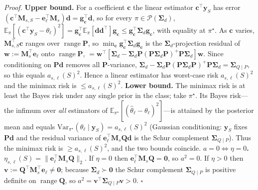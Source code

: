 \noindent\emph{Proof.}
\textbf{Upper bound.} For a coefficient $\bm c$ the linear estimator $\bm c^\top\bm y_S$ has error
$(\bm c^\top\bm M_{s,S}-\bm e_\ell^\top\bm M_s)\bm d=\bm g_{\bm c}^\top\bm d$, so for every
$\pi\in\mathcal P(\bm\Sigma_d)$, $\mathbb E_\pi[(\bm c^\top\bm y_S-\theta_\ell)^2]=
\bm g_{\bm c}^\top\mathbb E_\pi[\bm d\bm d^\top]\bm g_{\bm c}\le\bm g_{\bm c}^\top\bm\Sigma_d
\bm g_{\bm c}$, with equality at $\pi^\star$. As $\bm c$ varies, $\bm M_{s,S}^\top\bm c$ ranges over
$\operatorname{range}\bm P$, so $\min_{\bm c}\bm g_{\bm c}^\top\bm\Sigma_d\bm g_{\bm c}$ is the
$\bm\Sigma_d$-projection residual of $\bm w:=\bm M_s^\top\bm e_\ell$ onto $\operatorname{range}\bm P$,
$=\bm w^\top[\bm\Sigma_d-\bm\Sigma_d\bm P(\bm P\bm\Sigma_d\bm P)^{+}\bm P\bm\Sigma_d]\bm w$. Since
conditioning on $\bm P\bm d$ removes all $\bm P$-variance, $\bm\Sigma_d-\bm\Sigma_d\bm P(\bm P
\bm\Sigma_d\bm P)^{+}\bm P\bm\Sigma_d=\bm\Sigma_{Q\mid P}$, so this equals $a_{s,\ell}(S)^2$. Hence a
linear estimator has worst-case risk $a_{s,\ell}(S)^2$ and the minimax risk is $\le a_{s,\ell}(S)^2$.
\textbf{Lower bound.} The minimax risk is at least the Bayes risk under any single prior in the class;
take $\pi^\star$. Its Bayes risk---the infimum over \emph{all} estimators of $\mathbb E_{\pi^\star}[(
\hat\theta_\ell-\theta_\ell)^2]$---is attained by the posterior mean and equals
$\mathrm{Var}_{\pi^\star}(\theta_\ell\mid\bm y_S)=a_{s,\ell}(S)^2$ (Gaussian conditioning: $\bm y_S$
fixes $\bm P\bm d$ and the residual variance of $\bm e_\ell^\top\bm M_s\bm Q\bm d$ is the Schur
complement $\bm\Sigma_{Q\mid P}$). Thus the minimax risk is $\ge a_{s,\ell}(S)^2$, and the two bounds
coincide.
\textbf{$a{=}0\!\iff\!\eta{=}0$.} $\eta_{s,\ell}(S)=\|\bm e_\ell^\top\bm M_s\bm Q\|_2$. If $\eta{=}0$
then $\bm e_\ell^\top\bm M_s\bm Q=\bm0$, so $a^2=0$. If $\eta{>}0$ then $\bm v:=\bm Q^\top\bm M_s^\top
\bm e_\ell\neq\bm0$; because $\bm\Sigma_d\succ\bm0$ the Schur complement $\bm\Sigma_{Q\mid P}$ is
positive definite on $\operatorname{range}\bm Q$, so $a^2=\bm v^\top\bm\Sigma_{Q\mid P}\bm v>0$.
\hfill$\square$


